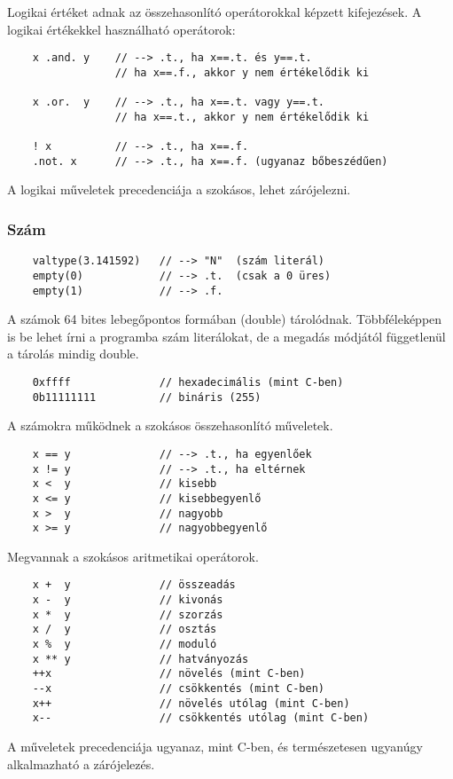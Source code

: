 Logikai értéket adnak az összehasonlító operátorokkal képzett kifejezések.
A logikai értékekkel használható operátorok:
\begin{verbatim}
    x .and. y    // --> .t., ha x==.t. és y==.t.
                 // ha x==.f., akkor y nem értékelődik ki

    x .or.  y    // --> .t., ha x==.t. vagy y==.t.
                 // ha x==.t., akkor y nem értékelődik ki
                 
    ! x          // --> .t., ha x==.f.
    .not. x      // --> .t., ha x==.f. (ugyanaz bőbeszédűen)
\end{verbatim}

A logikai műveletek precedenciája a szokásos, lehet zárójelezni.


\subsubsection{Szám}

\begin{verbatim}
    valtype(3.141592)   // --> "N"  (szám literál)
    empty(0)            // --> .t.  (csak a 0 üres)
    empty(1)            // --> .f.
\end{verbatim}

A számok 64 bites lebegőpontos formában (double) tárolódnak. 
Többféleképpen is be lehet írni a programba szám literálokat, 
de a megadás módjától függetlenül a tárolás mindig double.

\begin{verbatim}
    0xffff              // hexadecimális (mint C-ben)
    0b11111111          // bináris (255)
\end{verbatim}

A számokra működnek a szokásos összehasonlító műveletek.
\begin{verbatim}
    x == y              // --> .t., ha egyenlőek
    x != y              // --> .t., ha eltérnek
    x <  y              // kisebb
    x <= y              // kisebbegyenlő
    x >  y              // nagyobb
    x >= y              // nagyobbegyenlő
\end{verbatim}

Megvannak a szokásos aritmetikai operátorok.
\begin{verbatim}
    x +  y              // összeadás
    x -  y              // kivonás
    x *  y              // szorzás
    x /  y              // osztás
    x %  y              // moduló
    x ** y              // hatványozás
    ++x                 // növelés (mint C-ben)
    --x                 // csökkentés (mint C-ben)
    x++                 // növelés utólag (mint C-ben)
    x--                 // csökkentés utólag (mint C-ben)
\end{verbatim}
A műveletek precedenciája ugyanaz, mint C-ben, és természetesen ugyanúgy
alkalmazható a zárójelezés.

